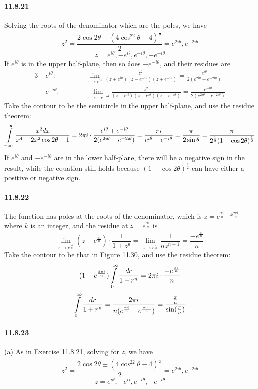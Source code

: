 \documentclass[a4paper]{article}
\begin{document}
\paragraph{11.8.21}
Solving the roots of the denominator which are the poles, we have
\[
z^2=\frac{2\cos2\theta\pm(4\cos^22\theta-4)^{\frac{1}{2}}}{2}=e^{2i\theta},e^{-2i\theta}
\]
\[
z=e^{i\theta},-e^{i\theta},e^{-i\theta},-e^{-i\theta}
\]
If $e^{i\theta}$ is in the upper half-plane, then so does $-e^{-i\theta}$, and their residues are
\begin{alignat*}{3}
    & e^{i\theta}:\qquad && \lim_{z\to e^{i\theta}}\frac{z^2}{(z+e^{i\theta})(z-e^{-i\theta})(z+e^{-i\theta})}=\frac{e^{i\theta}}{2(e^{2i\theta}-e^{-2i\theta})}\\
    - & e^{-i\theta}:\qquad && \lim_{z\to -e^{-i\theta}}\frac{z^2}{(z-e^{i\theta})(z+e^{i\theta})(z-e^{-i\theta})}=\frac{e^{-i\theta}}{2(e^{2i\theta}-e^{-2i\theta})}
\end{alignat*}
Take the contour to be the semicircle in the upper half-plane, and use the residue theorem: 
\[
\int\displaylimits_{-\infty}^\infty\frac{x^2dx}{x^4-2x^2\cos2\theta+1}=2\pi i\cdot\frac{e^{i\theta}+e^{-i\theta}}{2(e^{2i\theta}-e^{-2i\theta})}=\frac{\pi i}{e^{i\theta}-e^{-i\theta}}=\frac{\pi}{2\sin\theta}=\frac{\pi}{2^{\frac{1}{2}}(1-\cos2\theta)^{\frac{1}{2}}}
\]
If $e^{i\theta}$ and $-e^{-i\theta}$ are in the lower half-plane, there will be a negative sign in the result, while the equation still holds because $(1-\cos2\theta)^{\frac{1}{2}}$ can have either a positive or negative sign.

\paragraph{11.8.22}
The function has poles at the roots of the denominator, which is $z=e^{\frac{\pi i}{n}+k\frac{2\pi i}{n}}$ where $k$ is an integer, and the residue at $z=e^{\frac{\pi i}{n}}$ is
\[
\lim_{z\to e^{\frac{\pi i}{n}}}(z-e^{\frac{\pi i}{n}})\cdot\frac{1}{1+z^n}=\lim_{z\to e^{\frac{\pi i}{n}}}\frac{1}{nz^{n-1}}=\frac{-e^{\frac{\pi i}{n}}}{n}
\]
Take the contour to be that in Figure 11.30, and use the residue theorem:
\[
(1-e^{\frac{2\pi i}{n}})\int\displaylimits_{0}^\infty\frac{dr}{1+r^n}=2\pi i\cdot\frac{-e^{\frac{\pi i}{n}}}{n}
\]
\[
\int\displaylimits_0^\infty\frac{dr}{1+r^n}=\frac{2\pi i}{n(e^{\frac{\pi i}{n}}-e^{\frac{-\pi i}{n}})}=\frac{\frac{\pi}{n}}{\sin(\frac{\pi}{n})}
\]

\paragraph{11.8.23}
(a) As in Exercise 11.8.21, solving for $z$, we have
\[
z^2=\frac{2\cos2\theta\pm(4\cos^22\theta-4)^{\frac{1}{2}}}{2}=e^{2i\theta},e^{-2i\theta}
\]
\[
z=e^{i\theta},-e^{i\theta},e^{-i\theta},-e^{-i\theta}
\]
\end{document}
